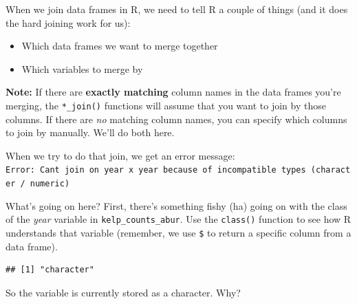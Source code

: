 \documentclass[]{book}
\newenvironment{Shaded}{\begin{snugshade}}{\end{snugshade}}
\newcommand{\CommentTok}[1]{\textcolor[rgb]{0.56,0.35,0.01}{\textit{#1}}}
\newcommand{\DecValTok}[1]{\textcolor[rgb]{0.00,0.00,0.81}{#1}}
\newcommand{\KeywordTok}[1]{\textcolor[rgb]{0.13,0.29,0.53}{\textbf{#1}}}
\newcommand{\NormalTok}[1]{#1}
\newcommand{\OperatorTok}[1]{\textcolor[rgb]{0.81,0.36,0.00}{\textbf{#1}}}
\newcommand{\StringTok}[1]{\textcolor[rgb]{0.31,0.60,0.02}{#1}}
\providecommand{\tightlist}{%
  \setlength{\itemsep}{0pt}\setlength{\parskip}{0pt}}
\begin{document}
When we join data frames in R, we need to tell R a couple of things (and it does the hard joining work for us):

\begin{itemize}
\tightlist
\item
  Which data frames we want to merge together
\item
  Which variables to merge by
\end{itemize}

\textbf{Note:} If there are \textbf{exactly matching} column names in the data frames you're merging, the \texttt{*\_join()} functions will assume that you want to join by those columns. If there are \emph{no} matching column names, you can specify which columns to join by manually. We'll do both here.

\begin{Shaded}
\end{Shaded}

When we try to do that join, we get an error message:
\texttt{Error:\ Can\textquotesingle{}t\ join\ on\ \textquotesingle{}year\textquotesingle{}\ x\ \textquotesingle{}year\textquotesingle{}\ because\ of\ incompatible\ types\ (character\ /\ numeric)}

What's going on here? First, there's something fishy (ha) going on with the class of the \emph{year} variable in \texttt{kelp\_counts\_abur}. Use the \texttt{class()} function to see how R understands that variable (remember, we use \texttt{\$} to return a specific column from a data frame).

\begin{Shaded}
\end{Shaded}

\begin{verbatim}
## [1] "character"
\end{verbatim}

So the variable is currently stored as a character. Why?
\end{document}
